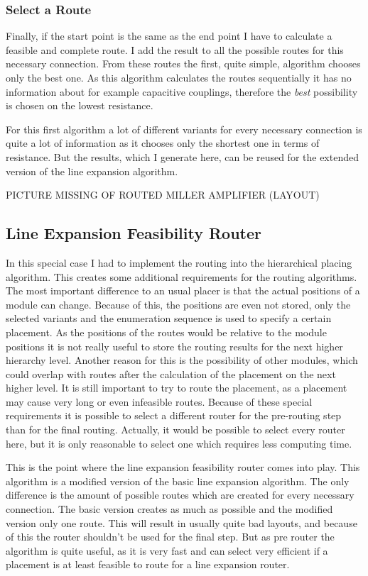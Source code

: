 \subsubsection{Select a Route}
Finally, if the start point is the same as the end point I have to calculate a feasible and complete route. I add the result to all the possible routes for this necessary connection. From these routes the first, quite simple, algorithm chooses only the best one. As this algorithm calculates the routes sequentially it has no information about for example capacitive couplings, therefore the \emph{best} possibility is chosen on the lowest resistance.

For this first algorithm a lot of different variants for every necessary connection is quite a lot of information as it chooses only the shortest one in terms of resistance. But the results, which I generate here, can be reused for the extended version of the line expansion algorithm.

PICTURE MISSING OF ROUTED MILLER AMPLIFIER (LAYOUT)

\subsection{Line Expansion Feasibility Router}
In this special case I had to implement the routing into the hierarchical placing algorithm. This creates some additional requirements for the routing algorithms. The most important difference to an usual placer is that the actual positions of a module can change. Because of this, the positions are even not stored, only the selected variants and the enumeration sequence is used to specify a certain placement. As the positions of the routes would be relative to the module positions it is not really useful to store the routing results for the next higher hierarchy level. Another reason for this is the possibility of other modules, which could overlap with routes after the calculation of the placement on the next higher level. It is still important to try to route the placement, as a placement may cause very long or even infeasible routes. Because of these special requirements it is possible to select a different router for the pre-routing step than for the final routing. Actually, it would be possible to select every router here, but it is only reasonable to select one which requires less computing time.

This is the point where the line expansion feasibility router comes into play. This algorithm is a modified version of the basic line expansion algorithm. The only difference  is the amount of possible routes which are created for every necessary connection. The basic version creates as much as possible and the modified version only one route. This will result in usually quite bad layouts, and because of this the router shouldn't be used for the final step. But as pre router the algorithm is quite useful, as it is very fast and can select very efficient if a placement is at least feasible to route for a line expansion router.

